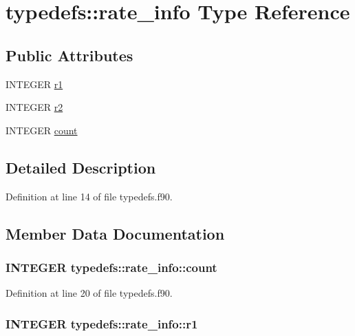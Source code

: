 \hypertarget{typetypedefs_1_1rate__info}{
\section{typedefs::rate\_\-info Type Reference}
\label{typetypedefs_1_1rate__info}
}
\subsection*{Public Attributes}
\begin{DoxyCompactItemize}
\item 
INTEGER \hyperlink{typetypedefs_1_1rate__info_a3d8b84c7cd12818e3dbcc846c330d3c2}{r1}
\item 
INTEGER \hyperlink{typetypedefs_1_1rate__info_a4fc3955386c2a940827c6d342f2a31db}{r2}
\item 
INTEGER \hyperlink{typetypedefs_1_1rate__info_a84d556d7f586b962935dcf8ad71eee38}{count}
\end{DoxyCompactItemize}


\subsection{Detailed Description}


Definition at line 14 of file typedefs.f90.

\subsection{Member Data Documentation}
\hypertarget{typetypedefs_1_1rate__info_a84d556d7f586b962935dcf8ad71eee38}{
\subsubsection[{count}]{\setlength{\rightskip}{0pt plus 5cm}INTEGER {\bf typedefs::rate\_\-info::count}}}
\label{typetypedefs_1_1rate__info_a84d556d7f586b962935dcf8ad71eee38}


Definition at line 20 of file typedefs.f90.\hypertarget{typetypedefs_1_1rate__info_a3d8b84c7cd12818e3dbcc846c330d3c2}{
\subsubsection[{r1}]{\setlength{\rightskip}{0pt plus 5cm}INTEGER {\bf typedefs::rate\_\-info::r1}}}
\label{typetypedefs_1_1rate__info_a3d8b84c7cd12818e3dbcc846c330d3c2}



